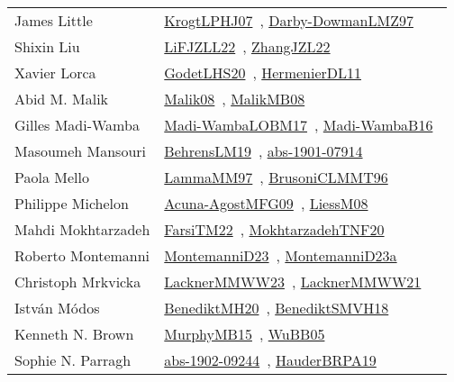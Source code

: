 {\begin{longtable}{p{4cm}p{20cm}}
James Little & \href{papers/KrogtLPHJ07.pdf}{KrogtLPHJ07}~\cite{KrogtLPHJ07}, \href{articles/Darby-DowmanLMZ97.pdf}{Darby-DowmanLMZ97}~\cite{Darby-DowmanLMZ97}\\
Shixin Liu & \href{papers/LiFJZLL22.pdf}{LiFJZLL22}~\cite{LiFJZLL22}, \href{papers/ZhangJZL22.pdf}{ZhangJZL22}~\cite{ZhangJZL22}\\
Xavier Lorca & \href{papers/GodetLHS20.pdf}{GodetLHS20}~\cite{GodetLHS20}, \href{papers/HermenierDL11.pdf}{HermenierDL11}~\cite{HermenierDL11}\\
Abid M. Malik & \href{}{Malik08}~\cite{Malik08}, \href{}{MalikMB08}~\cite{MalikMB08}\\
Gilles Madi{-}Wamba & \href{papers/Madi-WambaLOBM17.pdf}{Madi-WambaLOBM17}~\cite{Madi-WambaLOBM17}, \href{papers/Madi-WambaB16.pdf}{Madi-WambaB16}~\cite{Madi-WambaB16}\\
Masoumeh Mansouri & \href{papers/BehrensLM19.pdf}{BehrensLM19}~\cite{BehrensLM19}, \href{articles/abs-1901-07914.pdf}{abs-1901-07914}~\cite{abs-1901-07914}\\
Paola Mello & \href{articles/LammaMM97.pdf}{LammaMM97}~\cite{LammaMM97}, \href{papers/BrusoniCLMMT96.pdf}{BrusoniCLMMT96}~\cite{BrusoniCLMMT96}\\
Philippe Michelon & \href{papers/Acuna-AgostMFG09.pdf}{Acuna-AgostMFG09}~\cite{Acuna-AgostMFG09}, \href{articles/LiessM08.pdf}{LiessM08}~\cite{LiessM08}\\
Mahdi Mokhtarzadeh & \href{}{FarsiTM22}~\cite{FarsiTM22}, \href{}{MokhtarzadehTNF20}~\cite{MokhtarzadehTNF20}\\
Roberto Montemanni & \href{articles/MontemanniD23.pdf}{MontemanniD23}~\cite{MontemanniD23}, \href{articles/MontemanniD23a.pdf}{MontemanniD23a}~\cite{MontemanniD23a}\\
Christoph Mrkvicka & \href{articles/LacknerMMWW23.pdf}{LacknerMMWW23}~\cite{LacknerMMWW23}, \href{papers/LacknerMMWW21.pdf}{LacknerMMWW21}~\cite{LacknerMMWW21}\\
Istv{\'{a}}n M{\'{o}}dos & \href{articles/BenediktMH20.pdf}{BenediktMH20}~\cite{BenediktMH20}, \href{papers/BenediktSMVH18.pdf}{BenediktSMVH18}~\cite{BenediktSMVH18}\\
Kenneth N. Brown & \href{papers/MurphyMB15.pdf}{MurphyMB15}~\cite{MurphyMB15}, \href{papers/WuBB05.pdf}{WuBB05}~\cite{WuBB05}\\
Sophie N. Parragh & \href{articles/abs-1902-09244.pdf}{abs-1902-09244}~\cite{abs-1902-09244}, \href{articles/HauderBRPA19.pdf}{HauderBRPA19}~\cite{HauderBRPA19}\\

\end{longtable}}
